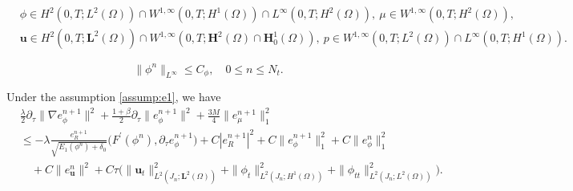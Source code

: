 \documentclass[10pt,a4paper]{amsart}
\newcommand{\mbfH}{\mathbf{H}}
\newcommand{\mbfL}{\mathbf{L}}
\newcommand{\p}{\partial}
\begin{document}
\begin{equation} \label{assump:e1}
	\begin{aligned}
		& \phi \in H^{2}(0,T; L^2(\Omega)) \cap W^{1, \infty}(0,T; H^1(\Omega)) \cap L^{\infty}(0,T; H^2(\Omega)), ~  \mu \in W^{1, \infty}(0,T; H^2(\Omega)),\\
		& \bm u \in H^{2}(0,T; \mbfL^2(\Omega)) \cap W^{1, \infty}(0,T;\mbfH^2(\Omega)\cap   \mbfH_0^1(\Omega)), ~ p \in W^{1, \infty}(0,T; L^2(\Omega))\cap L^{\infty}(0,T;H^1(\Omega)).
	\end{aligned}  
\end{equation}

\begin{equation} \label{bound_phi}
	\|\phi^n\|_{L^\infty} \le C_{\phi}, \quad 0 \leq n \le N_t.
\end{equation}

\begin{lemma} \label{lem:err:CH}
	Under the assumption \eqref{assump:e1}, we have
	\begin{equation*}  
		\begin{aligned}
			&\frac{\lambda }{2}\p_\tau \|\nabla e_\phi^{n+1}\|^2+\frac{1+\beta}{2}\p_\tau \|e_\phi^{n+1}\|^2
			+\frac{3M}{4}\|e_\mu^{n+1}\|_1^2 \\
			& \leq  -\lambda  \frac{e_R^{n+1}}{\sqrt{E_1(\phi^{n})+\delta_0}} \big(F^{\prime}(\phi^{n}),\p_\tau  e_\phi^{n+1}\big)
			+C|e_R^{n+1}|^2 + C\|e_\phi^{n+1}\|_1^2 + C\|e_\phi^n\|_1^2			\\
			& \quad    +C\|e_{\bm u}^n\|^2+C \tau \big(\|\bm u_t\|_{L^2(J_n ; \mbfL^2(\Omega))}^2+\|\phi_t\|_{L^2(J_n ; H^1(\Omega))}^2+\|\phi_{tt}\|_{L^2(J_n ; L^2(\Omega))}^2\big).
		\end{aligned}
	\end{equation*}
\end{lemma}
\end{document}
